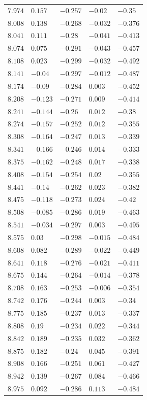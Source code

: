 \begin{center}
\begin{longtable}{lllll}
$7.974$&$0.157$&$-0.257$&$-0.02$&$-0.35$\\
$8.008$&$0.138$&$-0.268$&$-0.032$&$-0.376$\\
$8.041$&$0.111$&$-0.28$&$-0.041$&$-0.413$\\
$8.074$&$0.075$&$-0.291$&$-0.043$&$-0.457$\\
$8.108$&$0.023$&$-0.299$&$-0.032$&$-0.492$\\
$8.141$&$-0.04$&$-0.297$&$-0.012$&$-0.487$\\
$8.174$&$-0.09$&$-0.284$&$0.003$&$-0.452$\\
$8.208$&$-0.123$&$-0.271$&$0.009$&$-0.414$\\
$8.241$&$-0.144$&$-0.26$&$0.012$&$-0.38$\\
$8.274$&$-0.157$&$-0.252$&$0.012$&$-0.355$\\
$8.308$&$-0.164$&$-0.247$&$0.013$&$-0.339$\\
$8.341$&$-0.166$&$-0.246$&$0.014$&$-0.333$\\
$8.375$&$-0.162$&$-0.248$&$0.017$&$-0.338$\\
$8.408$&$-0.154$&$-0.254$&$0.02$&$-0.355$\\
$8.441$&$-0.14$&$-0.262$&$0.023$&$-0.382$\\
$8.475$&$-0.118$&$-0.273$&$0.024$&$-0.42$\\
$8.508$&$-0.085$&$-0.286$&$0.019$&$-0.463$\\
$8.541$&$-0.034$&$-0.297$&$0.003$&$-0.495$\\
$8.575$&$0.03$&$-0.298$&$-0.015$&$-0.484$\\
$8.608$&$0.082$&$-0.289$&$-0.022$&$-0.449$\\
$8.641$&$0.118$&$-0.276$&$-0.021$&$-0.411$\\
$8.675$&$0.144$&$-0.264$&$-0.014$&$-0.378$\\
$8.708$&$0.163$&$-0.253$&$-0.006$&$-0.354$\\
$8.742$&$0.176$&$-0.244$&$0.003$&$-0.34$\\
$8.775$&$0.185$&$-0.237$&$0.013$&$-0.337$\\
$8.808$&$0.19$&$-0.234$&$0.022$&$-0.344$\\
$8.842$&$0.189$&$-0.235$&$0.032$&$-0.362$\\
$8.875$&$0.182$&$-0.24$&$0.045$&$-0.391$\\
$8.908$&$0.166$&$-0.251$&$0.061$&$-0.427$\\
$8.942$&$0.139$&$-0.267$&$0.084$&$-0.466$\\
$8.975$&$0.092$&$-0.286$&$0.113$&$-0.484$\\

\end{longtable}
\end{center}
